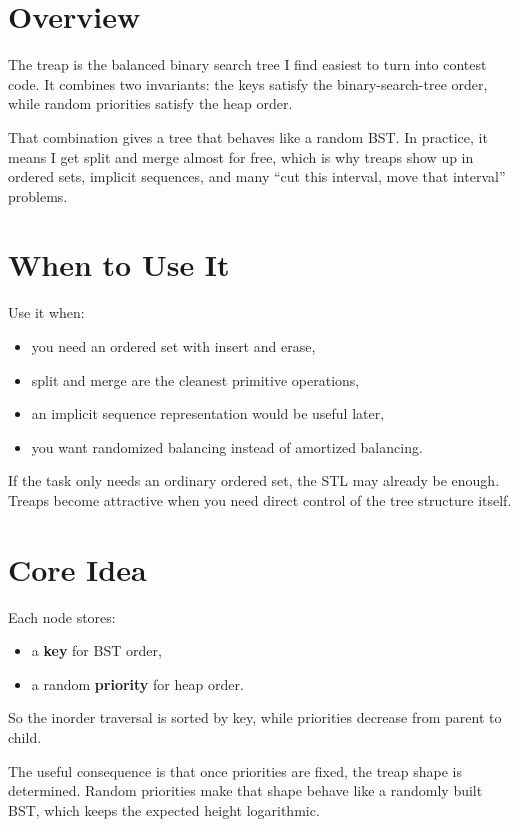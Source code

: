 \section*{Overview}

The treap is the balanced binary search tree I find easiest to turn into contest code. It combines two invariants:
the keys satisfy the binary-search-tree order, while random priorities satisfy the heap order.

That combination gives a tree that behaves like a random BST. In practice, it means I get split and merge almost for
free, which is why treaps show up in ordered sets, implicit sequences, and many ``cut this interval, move that
interval'' problems.

\section*{When to Use It}

Use it when:

\begin{itemize}
  \item you need an ordered set with insert and erase,
  \item split and merge are the cleanest primitive operations,
  \item an implicit sequence representation would be useful later,
  \item you want randomized balancing instead of amortized balancing.
\end{itemize}

If the task only needs an ordinary ordered set, the STL may already be enough. Treaps become attractive when you need
direct control of the tree structure itself.

\section*{Core Idea}

Each node stores:

\begin{itemize}
  \item a \textbf{key} for BST order,
  \item a random \textbf{priority} for heap order.
\end{itemize}

So the inorder traversal is sorted by key, while priorities decrease from parent to child.

The useful consequence is that once priorities are fixed, the treap shape is determined. Random priorities make that
shape behave like a randomly built BST, which keeps the expected height logarithmic.

